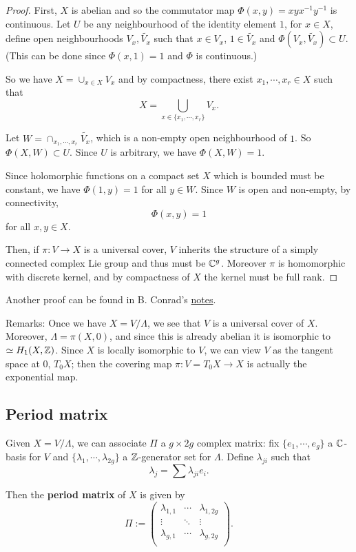 \begin{proof}
First, $X$ is abelian and so the commutator map $\Phi(x,y)=xyx^{-1}y^{-1}$ is continuous. Let $U$ be any neighbourhood of the identity element $1$, for $x\in X$, define open neighbourhoods $V_x,\tilde{V_x}$ such that $x\in V_x$, $1\in \tilde{V_x}$ and $\Phi(V_x,\tilde{V_x})\subset U$. (This can be done since $\Phi(x,1)=1$ and $\Phi$ is continuous.) 

So we have
$X=\cup_{x\in X} V_x$
and by compactness, there exist $x_1,\cdots, x_r\in X$ such that
$$X=\bigcup_{x\in \{x_1,\cdots,x_r\}} V_x.$$

Let $W=\cap_{x_1,\cdots,x_r} \tilde{V_x}$, which is a non-empty open neighbourhood of $1$. So $\Phi(X,W)\subset U$. Since $U$ is arbitrary, we have $\Phi(X,W)=1$. 

Since holomorphic functions on a compact set $X$ which is bounded must be constant, we have
$\Phi(1,y)=1$ for all $y\in W$. Since $W$ is open and non-empty, by connectivity, 
$$\Phi(x,y)=1$$
for all $x,y\in X$. 

Then, if $\pi:V\to X$ is a universal cover, $V$ inherits the structure of a simply connected complex Lie group and thus must be ${\mathbb C}^g$. Moreover $\pi$ is homomorphic with discrete kernel, and by compactness of $X$ the kernel must be full rank.
\end{proof}

Another proof can be found in B. Conrad's \href{http://math.stanford.edu/~conrad/vigregroup/vigre04/abvaran.pdf}{notes}.



Remarks: Once we have $X=V/\Lambda$, we see that $V$ is a universal cover of $X$. Moreover, $\Lambda=\pi(X,0)$, and since this is already abelian it is isomorphic to $\simeq H_1(X,{\mathbb Z})$. 
Since $X$ is locally isomorphic to $V$, we can view $V$ as the tangent space at $0$, $T_0X$; then the covering map $\pi:V=T_0X\to X$ is actually the exponential map.


\subsection{Period matrix}

Given $X=V/\Lambda$, we can associate $\Pi$ a $g\times 2g$ complex matrix: fix $\{e_1,\cdots, e_g\}$ a ${\mathbb C}$-basis for $V$ and $\{\lambda_1,\cdots,\lambda_{2g}\}$ a ${\mathbb Z}$-generator set for $\Lambda$. Define $\lambda_{ji}$ such that
$$\lambda_j=\sum \lambda_{ji} e_i.$$

Then the \textbf{period matrix} of $X$ is given by 
$$\Pi:=
\left(
\begin{array}{ccc}
\lambda_{1,1} & \cdots & \lambda_{1,2g}\\
\vdots & \ddots & \vdots\\
\lambda_{g,1} & \cdots & \lambda_{g,2g}\\
\end{array}
\right).$$

